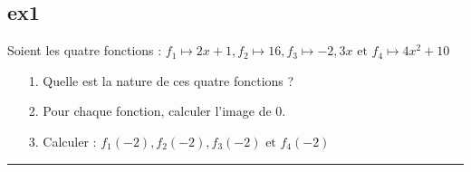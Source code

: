 \documentclass[10pt]{article}
\newcommand{\horrule}[1]{\rule{\linewidth}{#1}} %
\begin{document}
\begin{multicols}{2}
  \subsection*{ex1}

  Soient les quatre fonctions : 
  $f_1 \mapsto 2x +1, 
  f_2 \mapsto 16, 
  f_3 \mapsto -2,3x \text{ et } 
  f_4 \mapsto 4x^2 +10$

  \begin{itemize}
  \item[1.] Quelle est la nature de ces quatre fonctions ?
  \item[2.] Pour chaque fonction, calculer l'image de 0.
  \item[3.] Calculer : $f_1(-2), f_2(-2), f_3(-2)  \text{ et } f_4(-2)$
  \end{itemize}
\end{multicols}
\horrule{0.5px}
\end{document}
